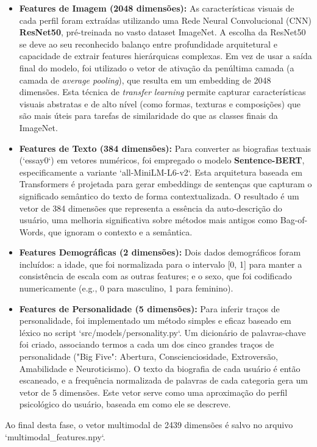 \begin{itemize}
    \item \textbf{Features de Imagem (2048 dimensões):} As características visuais de cada perfil foram extraídas utilizando uma Rede Neural Convolucional (CNN) \textbf{ResNet50}, pré-treinada no vasto dataset ImageNet. A escolha da ResNet50 se deve ao seu reconhecido balanço entre profundidade arquitetural e capacidade de extrair features hierárquicas complexas. Em vez de usar a saída final do modelo, foi utilizado o vetor de ativação da penúltima camada (a camada de \textit{average pooling}), que resulta em um embedding de 2048 dimensões. Esta técnica de \textit{transfer learning} permite capturar características visuais abstratas e de alto nível (como formas, texturas e composições) que são mais úteis para tarefas de similaridade do que as classes finais da ImageNet.

    \item \textbf{Features de Texto (384 dimensões):} Para converter as biografias textuais (`essay0`) em vetores numéricos, foi empregado o modelo \textbf{Sentence-BERT}, especificamente a variante `all-MiniLM-L6-v2`. Esta arquitetura baseada em Transformers é projetada para gerar embeddings de sentenças que capturam o significado semântico do texto de forma contextualizada. O resultado é um vetor de 384 dimensões que representa a essência da auto-descrição do usuário, uma melhoria significativa sobre métodos mais antigos como Bag-of-Words, que ignoram o contexto e a semântica.

    \item \textbf{Features Demográficas (2 dimensões):} Dois dados demográficos foram incluídos: a idade, que foi normalizada para o intervalo [0, 1] para manter a consistência de escala com as outras features; e o sexo, que foi codificado numericamente (e.g., 0 para masculino, 1 para feminino).

    \item \textbf{Features de Personalidade (5 dimensões):} Para inferir traços de personalidade, foi implementado um método simples e eficaz baseado em léxico no script `src/models/personality.py`. Um dicionário de palavras-chave foi criado, associando termos a cada um dos cinco grandes traços de personalidade ("Big Five": Abertura, Conscienciosidade, Extroversão, Amabilidade e Neuroticismo). O texto da biografia de cada usuário é então escaneado, e a frequência normalizada de palavras de cada categoria gera um vetor de 5 dimensões. Este vetor serve como uma aproximação do perfil psicológico do usuário, baseada em como ele se descreve.
\end{itemize}
Ao final desta fase, o vetor multimodal de 2439 dimensões é salvo no arquivo `multimodal_features.npy`.

